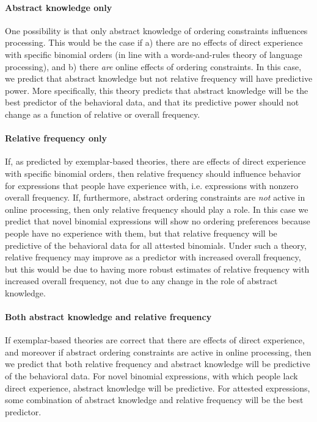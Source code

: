 \documentclass[authoryear]{elsarticle}
\begin{document}
\paragraph{Abstract knowledge only}
One possibility is that only abstract knowledge of ordering constraints influences processing. This would be the case if a) there are no effects of direct experience with specific binomial orders (in line with a words-and-rules theory of language processing), and b) there \emph{are} online effects of ordering constraints. In this case, we predict that abstract knowledge but not relative frequency will have predictive power. More specifically, this theory predicts that abstract knowledge will be the best predictor of the behavioral data, and that its predictive power should not change as a function of relative or overall frequency.

\paragraph{Relative frequency only}
If, as predicted by exemplar-based theories, there are effects of direct experience with specific binomial orders, then relative frequency should influence behavior for expressions that people have experience with, i.e. expressions with nonzero overall frequency. If, furthermore, abstract ordering constraints are \emph{not} active in online processing, then only relative frequency should play a role. In this case we predict that novel binomial expressions will show no ordering preferences because people have no experience with them, but that relative frequency will be predictive of the behavioral data for all attested binomials. Under such a theory, relative frequency may improve as a predictor with increased overall frequency, but this would be due to having more robust estimates of relative frequency with increased overall frequency, not due to any change in the role of abstract knowledge.

\paragraph{Both abstract knowledge and relative frequency}
If exemplar-based theories are correct that there are effects of direct experience, and moreover if abstract ordering constraints are active in online processing, then we predict that both relative frequency and abstract knowledge will be predictive of the behavioral data. For novel binomial expressions, with which people lack direct experience, abstract knowledge will be predictive. For attested expressions, some combination of abstract knowledge and relative frequency will be the best predictor.
\end{document}
